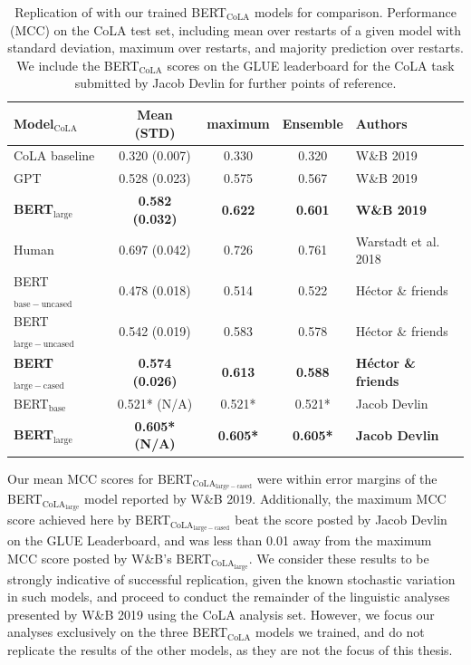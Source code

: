 \begin{table}[h]
    \centering
    \begin{tabular}{@{}lcccl@{}}
    \toprule
    \textbf{Model${_\mathrm{CoLA}}$} & \textbf{Mean (STD)} & \textbf{maximum} & \textbf{Ensemble} & \textbf{Authors} \\
    \midrule
    CoLA baseline & 0.320 (0.007) & 0.330 & 0.320 & W\&B 2019\\
    GPT & 0.528 (0.023) & 0.575 & 0.567 & W\&B 2019 \\
    \textbf{BERT$_{\mathrm{large}}$} & \textbf{0.582 (0.032)} & \textbf{0.622} & \textbf{0.601} & \textbf{W\&B 2019}\\
    Human & 0.697 (0.042) & 0.726 & 0.761 & Warstadt et al. 2018\\
    \midrule
    BERT$_{\mathrm{base-uncased}}$ & 0.478 (0.018) & 0.514 & 0.522 & H\'ector \& friends \\
    BERT$_{\mathrm{large-uncased}}$ & 0.542 (0.019) & 0.583 & 0.578 & H\'ector \& friends \\
    \textbf{BERT$_{\mathrm{large-cased}}$} & \textbf{0.574 (0.026)} & \textbf{0.613} & \textbf{0.588} & \textbf{H\'ector \& friends} \\
    \midrule
    BERT$_{\mathrm{base}}$ & 0.521* (N/A) & 0.521* & 0.521* & Jacob Devlin \\
    \textbf{BERT$_{\mathrm{large}}$} & \textbf{0.605* (N/A)} & \textbf{0.605*} & \textbf{0.605*} & \textbf{Jacob Devlin} \\
    \bottomrule
    \end{tabular}
    \caption[MCC scores on the CoLA out-of-domain test set]{Replication of \citet{warstadt2019linguistic} with our trained BERT$_\mathrm{CoLA}$ models for comparison.  Performance (MCC) on the CoLA test set, including mean over restarts of a given model with standard deviation, maximum over restarts, and majority prediction over restarts.  We include the BERT$_\mathrm{CoLA}$ scores on the GLUE leaderboard for the CoLA task submitted by Jacob Devlin for further points of reference.}
    \label{tab:table_6}
\end{table}

Our mean MCC scores for BERT$_\mathrm{CoLA_{large-cased}}$ were within error margins of the BERT$_\mathrm{CoLA_{large}}$ model reported by W\&B 2019.  Additionally, the maximum MCC score achieved here by BERT$_\mathrm{CoLA_{large-cased}}$ beat the score posted by Jacob Devlin on the GLUE Leaderboard, and was less than 0.01 away from the maximum MCC score posted by W\&B's  BERT$_\mathrm{CoLA_{large}}$.  We consider these results to be strongly indicative of successful replication, given the known stochastic variation in such models, and proceed to conduct the remainder of the linguistic analyses presented by W\&B 2019 using the CoLA analysis set.  However, we focus our analyses exclusively on the three  BERT$_\mathrm{CoLA}$ models we trained, and do not replicate the results of the other models, as they are not the focus of this thesis.

